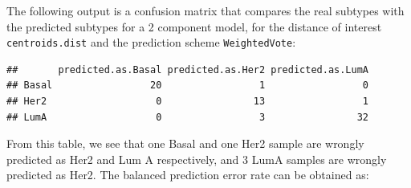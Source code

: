 \documentclass[]{book}
\newenvironment{Shaded}{\begin{snugshade}}{\end{snugshade}}
\newcommand{\KeywordTok}[1]{\textcolor[rgb]{0.13,0.29,0.53}{\textbf{#1}}}
\newcommand{\DataTypeTok}[1]{\textcolor[rgb]{0.13,0.29,0.53}{#1}}
\newcommand{\DecValTok}[1]{\textcolor[rgb]{0.00,0.00,0.81}{#1}}
\newcommand{\StringTok}[1]{\textcolor[rgb]{0.31,0.60,0.02}{#1}}
\newcommand{\CommentTok}[1]{\textcolor[rgb]{0.56,0.35,0.01}{\textit{#1}}}
\newcommand{\OperatorTok}[1]{\textcolor[rgb]{0.81,0.36,0.00}{\textbf{#1}}}
\newcommand{\NormalTok}[1]{#1}
\begin{document}
\begin{Shaded}
\end{Shaded}

The following output is a confusion matrix that compares the real
subtypes with the predicted subtypes for a 2 component model, for the
distance of interest \texttt{centroids.dist} and the prediction scheme
\texttt{WeightedVote}:

\begin{Shaded}
\end{Shaded}

\begin{verbatim}
##       predicted.as.Basal predicted.as.Her2 predicted.as.LumA
## Basal                 20                 1                 0
## Her2                   0                13                 1
## LumA                   0                 3                32
\end{verbatim}

From this table, we see that one Basal and one Her2 sample are wrongly
predicted as Her2 and Lum A respectively, and 3 LumA samples are wrongly
predicted as Her2. The balanced prediction error rate can be obtained
as:
\end{document}

